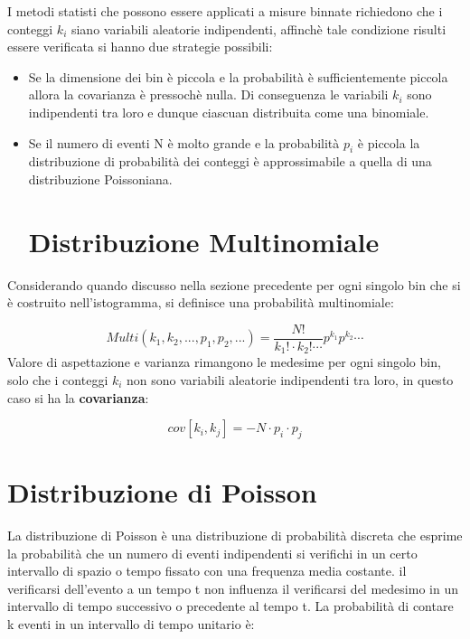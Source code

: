 \documentclass[11pt,a4paper]{book}
\begin{document}
I metodi statisti che possono essere applicati a misure binnate richiedono che i conteggi $k_{i}$ siano variabili aleatorie indipendenti, affinch\`{e} tale condizione risulti essere verificata si hanno due strategie possibili:

\begin{itemize}
\item
\noindent Se la dimensione dei bin \`{e} piccola e la probabilit\`{a} \`{e} sufficientemente piccola allora la covarianza \`{e} pressoch\`{e} nulla. Di conseguenza le variabili $k_i$ sono indipendenti tra loro e dunque ciascuan distribuita come una binomiale.
\item
\noindent Se il numero di eventi N \`{e} molto grande e la probabilit\`{a} $p_i$ \`{e} piccola la distribuzione di probabilit\`{a} dei conteggi \`{e} approssimabile a quella di una distribuzione Poissoniana. 
\section{Distribuzione Multinomiale}

\end{itemize}

Considerando quando discusso nella sezione precedente per ogni singolo bin che si \`{e} costruito nell'istogramma, si definisce una probabilit\`{a} multinomiale:

\begin{equation}
	Multi(k_1,k_2,...,p_1,p_2,...) = \dfrac{N!}{k_1!\cdot k_2! \cdots}p^{k_{1}}p^{k_2}\cdots
\end{equation}
\newline
\noindent Valore di aspettazione e varianza rimangono le medesime per ogni singolo bin, solo che i conteggi $k_i$ non sono variabili aleatorie indipendenti tra loro, in questo caso si ha la \textbf{covarianza}:

\begin{equation}
	cov[k_i,k_j] = -N \cdot p_i \cdot p_j 
\end{equation}

\section{Distribuzione di Poisson}

La distribuzione di Poisson \`{e} una distribuzione di probabilit\`{a} discreta che esprime la probabilit\`{a} che un numero di eventi indipendenti si verifichi in un certo intervallo di spazio o tempo fissato con una frequenza media costante. il verificarsi dell'evento a un tempo t non influenza il verificarsi del medesimo in un intervallo di tempo successivo o precedente  al tempo t.
La probabilit\`{a} di contare k eventi in un intervallo di tempo unitario \`{e}:
\end{document}
